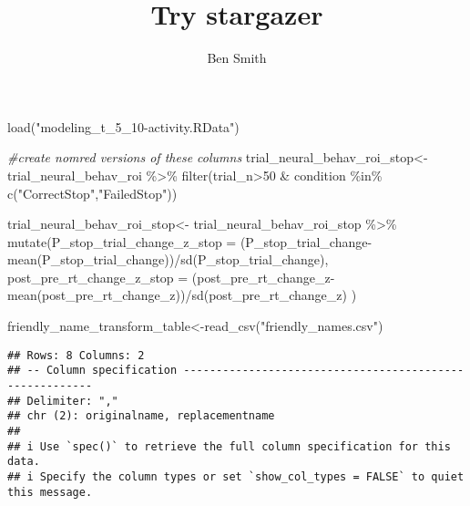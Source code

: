 \documentclass[
]{article}
\title{Try stargazer}
\author{Ben Smith}
\date{}
\newenvironment{Shaded}{\begin{snugshade}}{\end{snugshade}}
\newcommand{\AttributeTok}[1]{\textcolor[rgb]{0.77,0.63,0.00}{#1}}
\newcommand{\CommentTok}[1]{\textcolor[rgb]{0.56,0.35,0.01}{\textit{#1}}}
\newcommand{\DecValTok}[1]{\textcolor[rgb]{0.00,0.00,0.81}{#1}}
\newcommand{\FunctionTok}[1]{\textcolor[rgb]{0.00,0.00,0.00}{#1}}
\newcommand{\NormalTok}[1]{#1}
\newcommand{\OtherTok}[1]{\textcolor[rgb]{0.56,0.35,0.01}{#1}}
\newcommand{\SpecialCharTok}[1]{\textcolor[rgb]{0.00,0.00,0.00}{#1}}
\newcommand{\StringTok}[1]{\textcolor[rgb]{0.31,0.60,0.02}{#1}}
\begin{document}
\maketitle

{
\setcounter{tocdepth}{2}
\tableofcontents
}
\begin{Shaded}
\begin{Highlighting}[]
\FunctionTok{load}\NormalTok{(}\StringTok{"modeling\_t\_5\_10{-}activity.RData"}\NormalTok{)}
\end{Highlighting}
\end{Shaded}

\begin{Shaded}
\begin{Highlighting}[]
\CommentTok{\#create nomred versions of these columns}
\NormalTok{trial\_neural\_behav\_roi\_stop}\OtherTok{\textless{}{-}}\NormalTok{trial\_neural\_behav\_roi }\SpecialCharTok{\%\textgreater{}\%} \FunctionTok{filter}\NormalTok{(trial\_n}\SpecialCharTok{\textgreater{}}\DecValTok{50} \SpecialCharTok{\&}\NormalTok{ condition }\SpecialCharTok{\%in\%} \FunctionTok{c}\NormalTok{(}\StringTok{"CorrectStop"}\NormalTok{,}\StringTok{"FailedStop"}\NormalTok{))}

\NormalTok{trial\_neural\_behav\_roi\_stop}\OtherTok{\textless{}{-}}\NormalTok{ trial\_neural\_behav\_roi\_stop }\SpecialCharTok{\%\textgreater{}\%} 
  \FunctionTok{mutate}\NormalTok{(}\AttributeTok{P\_stop\_trial\_change\_z\_stop =}\NormalTok{ (P\_stop\_trial\_change}\SpecialCharTok{{-}}\FunctionTok{mean}\NormalTok{(P\_stop\_trial\_change))}\SpecialCharTok{/}\FunctionTok{sd}\NormalTok{(P\_stop\_trial\_change),}
         \AttributeTok{post\_pre\_rt\_change\_z\_stop =}\NormalTok{ (post\_pre\_rt\_change\_z}\SpecialCharTok{{-}}\FunctionTok{mean}\NormalTok{(post\_pre\_rt\_change\_z))}\SpecialCharTok{/}\FunctionTok{sd}\NormalTok{(post\_pre\_rt\_change\_z)}
\NormalTok{         )}

\NormalTok{friendly\_name\_transform\_table}\OtherTok{\textless{}{-}}\FunctionTok{read\_csv}\NormalTok{(}\StringTok{"friendly\_names.csv"}\NormalTok{)}
\end{Highlighting}
\end{Shaded}

\begin{verbatim}
## Rows: 8 Columns: 2
## -- Column specification --------------------------------------------------------
## Delimiter: ","
## chr (2): originalname, replacementname
## 
## i Use `spec()` to retrieve the full column specification for this data.
## i Specify the column types or set `show_col_types = FALSE` to quiet this message.
\end{verbatim}
\end{document}
